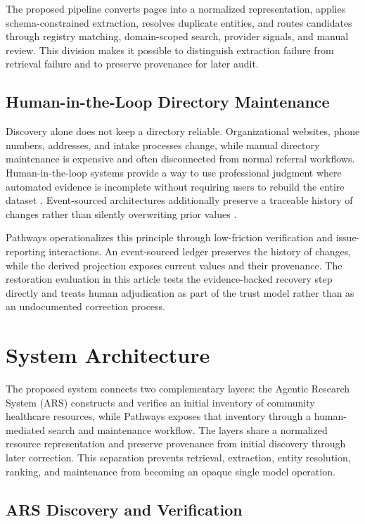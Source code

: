 \documentclass[journal,article,submit,moreauthors]{Definitions/mdpi}
\begin{document}
The proposed pipeline converts pages into a normalized representation, applies schema-constrained extraction, resolves duplicate entities, and routes candidates through registry matching, domain-scoped search, provider signals, and manual review. This division makes it possible to distinguish extraction failure from retrieval failure and to preserve provenance for later audit.

\subsection{Human-in-the-Loop Directory Maintenance}
Discovery alone does not keep a directory reliable. Organizational websites, phone numbers, addresses, and intake processes change, while manual directory maintenance is expensive and often disconnected from normal referral workflows. Human-in-the-loop systems provide a way to use professional judgment where automated evidence is incomplete without requiring users to rebuild the entire dataset \citep{amershi2014,olawade2026human}. Event-sourced architectures additionally preserve a traceable history of changes rather than silently overwriting prior values \citep{fowler_event}.

Pathways operationalizes this principle through low-friction verification and issue-reporting interactions. An event-sourced ledger preserves the history of changes, while the derived projection exposes current values and their provenance. The restoration evaluation in this article tests the evidence-backed recovery step directly and treats human adjudication as part of the trust model rather than as an undocumented correction process.

\section{System Architecture}

The proposed system connects two complementary layers: the Agentic Research System (ARS) constructs and verifies an initial inventory of community healthcare resources, while Pathways exposes that inventory through a human-mediated search and maintenance workflow. The layers share a normalized resource representation and preserve provenance from initial discovery through later correction. This separation prevents retrieval, extraction, entity resolution, ranking, and maintenance from becoming an opaque single model operation.

\subsection{ARS Discovery and Verification}
\end{document}
